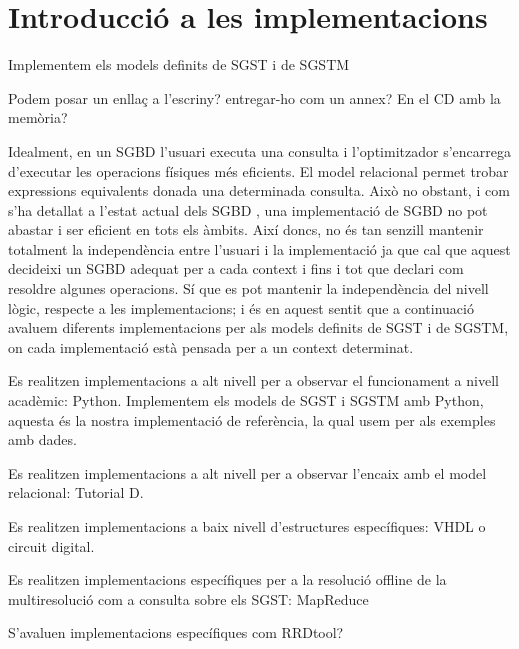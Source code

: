 

\chapter{Introducció a les implementacions}


Implementem els models definits de \gls{SGST} i de \gls{SGSTM}


Podem posar un enllaç a l'escriny? entregar-ho com un annex? En el CD amb la memòria?



Idealment, en un \gls{SGBD} l'usuari executa una consulta i
l'optimitzador s'encarrega d'executar les operacions físiques més
eficients. El model relacional permet trobar expressions equivalents
donada una determinada consulta. Això no obstant, i com s'ha detallat
a l'estat actual dels \gls{SGBD} , una implementació de
\gls{SGBD} no pot abastar i ser eficient en tots els àmbits. Així
doncs, no és tan senzill mantenir totalment la independència entre
l'usuari i la implementació ja que cal que aquest decideixi un
\gls{SGBD} adequat per a cada context i fins i tot que declari com
resoldre algunes operacions. Sí que es pot mantenir la independència
del nivell lògic, respecte a les implementacions; i és en aquest
sentit que a continuació avaluem diferents implementacions per als
models definits de \gls{SGST} i de \gls{SGSTM}, on cada implementació
està pensada per a un context determinat.





Es realitzen implementacions a alt nivell per a observar el funcionament a nivell acadèmic: Python. Implementem els models de \gls{SGST} i \gls{SGSTM} amb Python, aquesta és la nostra implementació de referència, la qual usem per als exemples amb dades.

Es realitzen implementacions a alt nivell per a observar l'encaix amb el model relacional: Tutorial D.

Es realitzen implementacions a baix nivell d'estructures específiques: VHDL o circuit digital.


Es realitzen implementacions específiques per a la resolució offline de la multiresolució com a consulta sobre els \gls{SGST}: MapReduce


S'avaluen implementacions específiques com RRDtool?




